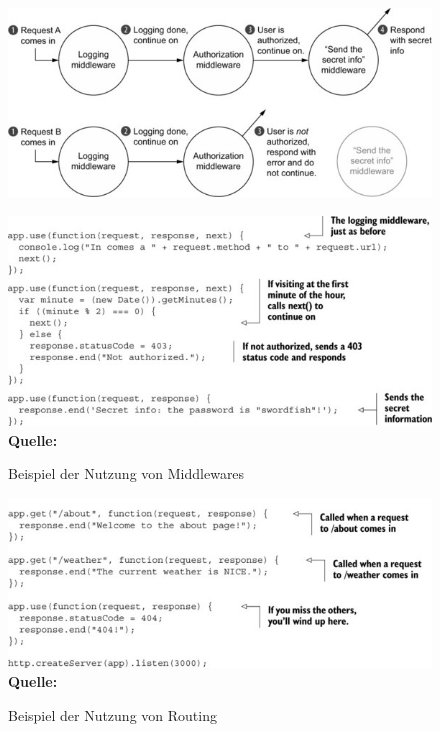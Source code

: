 \documentclass[a4paper,12pt]{report}
\begin{document}
  \begin{figure}[ht]
\raggedleft
  \includegraphics[width=160mm]{Middleware-Beispiel.jpg}
  
  \vspace{20mm}
  
  \includegraphics[width=160mm]{Middleware-Beispiel-2.jpg}
    \footnotesize\sffamily\textbf{Quelle:} \cite{expressbook}
  \caption{Beispiel der Nutzung von Middlewares}
  \label{fig:middleware-beispiel}
\end{figure}

  \begin{figure}[ht]
\raggedleft
  \includegraphics[width=160mm]{express-routing-example.jpg}
    \footnotesize\sffamily\textbf{Quelle:} \cite{expressbook}
  \caption{Beispiel der Nutzung von Routing}
  \label{fig:routing-beispiel}
\end{figure}
\end{document}
